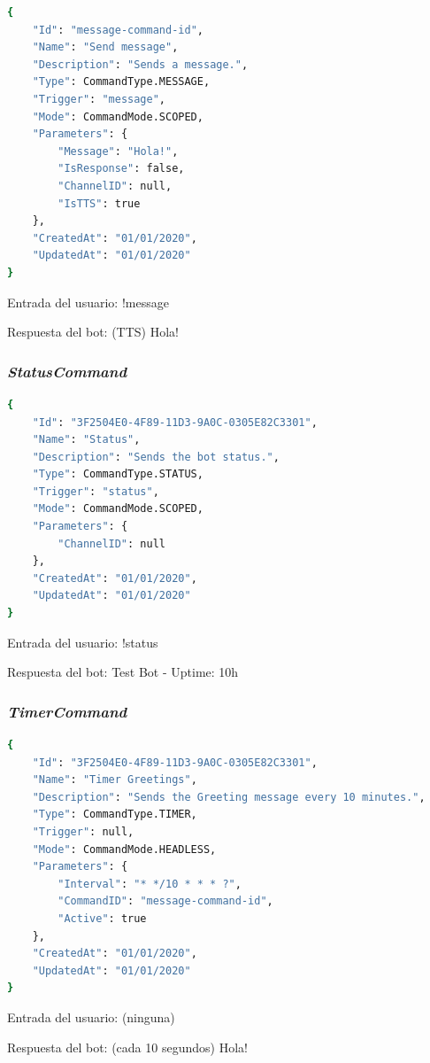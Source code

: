 \begin{lstlisting}[language=sh]
{
    "Id": "message-command-id",
    "Name": "Send message",
    "Description": "Sends a message.",
    "Type": CommandType.MESSAGE,
    "Trigger": "message",
    "Mode": CommandMode.SCOPED,
    "Parameters": {
        "Message": "Hola!",
        "IsResponse": false,
        "ChannelID": null,
        "IsTTS": true
    },
    "CreatedAt": "01/01/2020",
    "UpdatedAt": "01/01/2020"
}
\end{lstlisting}

Entrada del usuario: !message

Respuesta del bot: (TTS) Hola!



\subsubsection{\textit{StatusCommand}}

\begin{lstlisting}[language=sh]
{
    "Id": "3F2504E0-4F89-11D3-9A0C-0305E82C3301",
    "Name": "Status",
    "Description": "Sends the bot status.",
    "Type": CommandType.STATUS,
    "Trigger": "status",
    "Mode": CommandMode.SCOPED,
    "Parameters": {
        "ChannelID": null
    },
    "CreatedAt": "01/01/2020",
    "UpdatedAt": "01/01/2020"
}
\end{lstlisting}

Entrada del usuario: !status

Respuesta del bot: Test Bot - Uptime: 10h


\pagebreak

\subsubsection{\textit{TimerCommand}}

\begin{lstlisting}[language=sh]
{
    "Id": "3F2504E0-4F89-11D3-9A0C-0305E82C3301",
    "Name": "Timer Greetings",
    "Description": "Sends the Greeting message every 10 minutes.",
    "Type": CommandType.TIMER,
    "Trigger": null,
    "Mode": CommandMode.HEADLESS,
    "Parameters": {
        "Interval": "* */10 * * * ?",
        "CommandID": "message-command-id",
        "Active": true
    },
    "CreatedAt": "01/01/2020",
    "UpdatedAt": "01/01/2020"
}
\end{lstlisting}

Entrada del usuario: (ninguna)

Respuesta del bot: (cada 10 segundos) Hola!



